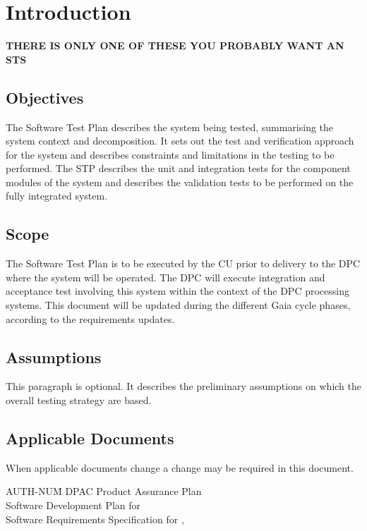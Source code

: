 


\section{Introduction \label{sect:intro}}

{\bf THERE IS ONLY ONE OF THESE YOU PROBABLY WANT AN STS}


\subsection{Objectives \label{sect:objectives}}

The Software Test Plan describes the system being tested, summarising the system context and decomposition. It sets out the test and verification approach for the system and describes constraints and limitations in the testing to be performed. The STP describes the unit and integration tests for the component modules of the system and describes the validation tests to be performed on the fully integrated system. 

\subsection{Scope \label{sect:scope}}

The Software Test Plan is to be executed by the CU prior to delivery to the DPC where the system will be operated. The DPC will execute integration and acceptance test involving this system within the context of the DPC processing systems.
This document will be updated during the different Gaia cycle phases, according to the requirements updates.

\subsection{Assumptions}  
This paragraph is optional. It describes the preliminary assumptions on which the overall testing strategy are based.
 
\subsection{Applicable Documents \label{sect:ad}}
When applicable documents change a change may be required in this document.
\begin{tabbing}
AUTH-NUM\= \kill 
{}\>	DPAC Product Assurance Plan \\
 \>	Software Development Plan for \CU \\
\>	Software Requirements Specification for \product,\\
\end{tabbing}

